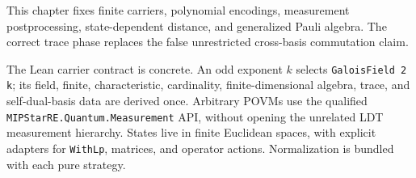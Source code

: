 
This chapter fixes finite carriers, polynomial encodings, measurement
postprocessing, state-dependent distance, and generalized Pauli algebra. The
correct trace phase replaces the false unrestricted cross-basis commutation
claim.

The Lean carrier contract is concrete.  An odd exponent $k$ selects
\texttt{GaloisField 2 k}; its field, finite, characteristic, cardinality,
finite-dimensional algebra, trace, and self-dual-basis data are derived once.
Arbitrary POVMs use the qualified \texttt{MIPStarRE.Quantum.Measurement} API,
without opening the unrelated LDT measurement hierarchy.  States live in
finite Euclidean spaces, with explicit adapters for \texttt{WithLp}, matrices,
and operator actions.  Normalization is bundled with each pure strategy.


